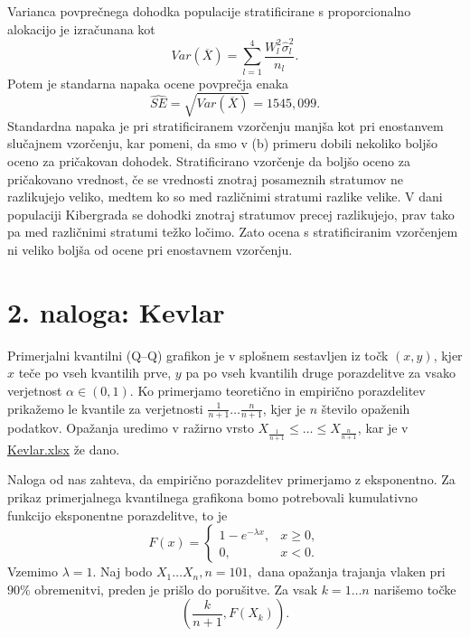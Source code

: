 \documentclass{article}
\begin{document}
Varianca povprečnega dohodka populacije stratificirane s proporcionalno alokacijo 
je izračunana kot
$$ Var \left( \overline{X} \right) = \sum_{l=1}^{4} \frac{W^2_l \hat{\sigma}_l^2}{n_l} \text{.}$$
Potem je standarna napaka ocene povprečja enaka
$$ \widehat{SE} = \sqrt{Var \left( \overline{X} \right)} = 1545{,}099
 \text{.}$$
Standardna napaka je pri stratificiranem vzorčenju manjša kot pri enostanvem slučajnem 
vzorčenju, kar pomeni, da smo v (b) primeru dobili nekoliko boljšo oceno za pričakovan 
dohodek. Stratificirano vzorčenje da boljšo oceno za pričakovano vrednost, če se
vrednosti znotraj posameznih stratumov ne razlikujejo veliko, medtem ko so med različnimi
stratumi razlike velike. V dani populaciji Kibergrada se dohodki znotraj stratumov precej 
razlikujejo, prav tako pa med različnimi stratumi težko ločimo. Zato ocena s stratificiranim
vzorčenjem ni veliko boljša od ocene pri enostavnem vzorčenju.


\section*{2. naloga: Kevlar}
Primerjalni kvantilni (Q--Q) grafikon je v splošnem sestavljen iz točk $(x, y)$, kjer $x$
teče po vseh kvantilih prve, $y$ pa po vseh kvantilih druge porazdelitve za vsako verjetnost 
$\alpha \in \left( 0, 1\right)$. Ko primerjamo teoretično in empirično porazdelitev prikažemo
le kvantile za verjetnosti $\frac{1}{n + 1} \dots \frac{n}{n + 1}$, kjer je $n$ število opaženih
podatkov. Opažanja uredimo v ražirno vrsto $X_{\frac{1}{n+1}} \leq \dots \leq X_{\frac{n}{n+1}}$, 
kar je v \url{Kevlar.xlsx} že dano. 

Naloga od nas zahteva, da empirično porazdelitev primerjamo z eksponentno. Za prikaz primerjalnega
kvantilnega grafikona bomo potrebovali kumulativno funkcijo eksponentne porazdelitve, to je 
$$ F(x) =
\begin{cases}
    1 - e^{- \lambda x}, & x \geq 0, \\
    0, & x < 0 \text{.}
\end{cases}
$$
Vzemimo $\lambda = 1$.
Naj bodo $X_1 \dots X_n, n = 101,$ dana opažanja trajanja vlaken pri $90\%$ obremenitvi, preden je prišlo 
do porušitve. Za vsak $k = 1 \dots n$ narišemo točke
$$ \left( \frac{k}{n + 1}, F \left( X_k \right)\right) \text{.}$$
\end{document}
